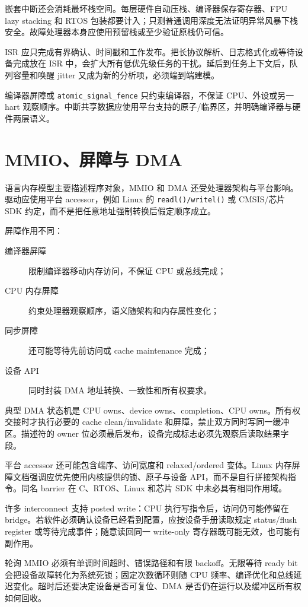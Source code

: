 嵌套中断还会消耗最坏栈空间。每层硬件自动压栈、编译器保存寄存器、FPU lazy stacking 和 RTOS 包装都要计入；只测普通调用深度无法证明异常风暴下栈安全。故障处理器本身应使用预留栈或至少验证原栈仍可信。

ISR 应只完成有界确认、时间戳和工作发布。把长协议解析、日志格式化或等待设备完成放在 ISR 中，会扩大所有低优先级任务的干扰。延后到任务上下文后，队列容量和唤醒 jitter 又成为新的分析项，必须端到端建模。

编译器屏障或 \texttt{atomic\_signal\_fence} 只约束编译器，不保证 CPU、外设或另一 hart 观察顺序。中断共享数据应使用平台支持的原子/临界区，并明确编译器与硬件两层语义。

\section{MMIO、屏障与 DMA}

语言内存模型主要描述程序对象，MMIO 和 DMA 还受处理器架构与平台影响。驱动应使用平台 accessor，例如 Linux 的 \texttt{readl()/writel()} 或 CMSIS/芯片 SDK 约定，而不是把任意地址强制转换后假定顺序成立。

屏障作用不同：
\begin{description}
  \item[编译器屏障] 限制编译器移动内存访问，不保证 CPU 或总线完成；
  \item[CPU 内存屏障] 约束处理器观察顺序，语义随架构和内存属性变化；
  \item[同步屏障] 还可能等待先前访问或 cache maintenance 完成；
  \item[设备 API] 同时封装 DMA 地址转换、一致性和所有权要求。
\end{description}

典型 DMA 状态机是 CPU owns、device owns、completion、CPU owns。所有权交接时才执行必要的 cache clean/invalidate 和屏障，禁止双方同时写同一缓冲区。描述符的 owner 位必须最后发布，设备完成标志必须先观察后读取结果字段。

平台 accessor 还可能包含端序、访问宽度和 relaxed/ordered 变体。Linux 内存屏障文档强调应优先使用内核提供的锁、原子与设备 API，而不是自行拼接架构指令\cite{linux-memory-barriers-doc}。同名 barrier 在 C、RTOS、Linux 和芯片 SDK 中未必具有相同作用域。

许多 interconnect 支持 posted write：CPU 执行写指令后，访问仍可能停留在 bridge。若软件必须确认设备已经看到配置，应按设备手册读取规定 status/flush register 或等待完成事件；随意读回同一 write-only 寄存器既可能无效，也可能有副作用。

轮询 MMIO 必须有单调时间超时、错误路径和有限 backoff。无限等待 ready bit 会把设备故障转化为系统死锁；固定次数循环则随 CPU 频率、编译优化和总线延迟变化。超时后还要决定设备是否可复位、DMA 是否仍在运行以及缓冲区所有权如何回收。

